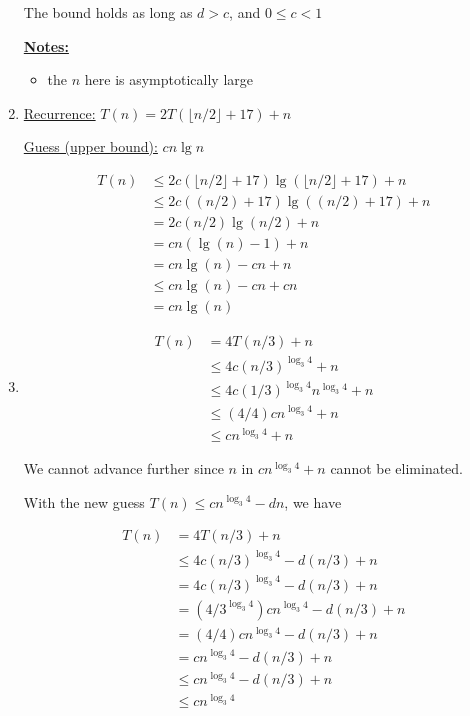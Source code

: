 \documentclass[12pt]{article}
\begin{document}
\begin{enumerate}[1.]
    \bigskip

    The bound holds as long as $d > c$, and $0 \leq c < 1$

    \bigskip


    \underline{\textbf{Notes:}}

    \bigskip

    \begin{itemize}
        \item the $n$ here is asymptotically large
    \end{itemize}

    \item

    \underline{Recurrence:} $T(n) = 2T(\lfloor n/2 \rfloor + 17) + n$

    \bigskip

    \underline{Guess (upper bound):} $cn \lg n$

    \bigskip

    \begin{align}
        T(n) &\leq 2c(\lfloor n/2 \rfloor + 17)\lg(\lfloor n/2 \rfloor + 17) + n\\
        &\leq 2c((n/2) + 17) \lg ((n/2) + 17) + n\\
        &= 2c(n/2) \lg (n/2) + n\\
        &= cn (\lg(n) - 1) + n\\
        &= cn \lg (n) - cn + n\\
        &\leq cn \lg (n) - cn + cn\\
        &= cn \lg (n)
    \end{align}

    \item
    \setcounter{equation}{0}
    \begin{align}
        T(n) &= 4T(n/3) + n\\
        &\leq 4c (n/3)^{\log_3 4} + n\\
        &\leq 4c(1/3)^{\log_3 4}n^{\log_3 4} + n\\
        &\leq (4/4)cn^{\log_3 4} + n\\
        &\leq cn^{\log_3 4} + n
    \end{align}

    We cannot advance further since $n$ in $cn^{\log_3 4} + n$ cannot be eliminated.

    \bigskip

    With the new guess $T(n) \leq cn^{\log_3 4} - dn$, we have

    \begin{align}
        T(n) &= 4T(n/3) + n\\
        &\leq 4c(n/3)^{\log_3 4} - d(n/3) + n\\
        &= 4c(n/3)^{\log_3 4} - d(n/3) + n\\
        &= (4/3^{\log_3 4})cn^{\log_3 4} - d(n/3) + n\\
        &= (4/4)cn^{\log_3 4} - d(n/3) + n\\
        &= cn^{\log_3 4} - d(n/3) + n\\
        &\leq cn^{\log_3 4} - d(n/3) + n\\
        &\leq cn^{\log_3 4}
    \end{align}


\end{enumerate}
\end{document}

